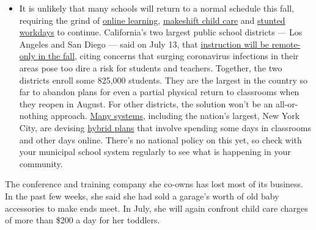 \begin{itemize}
  \begin{itemize}
  \tightlist
  \item
    It is unlikely that many schools will return to a normal schedule
    this fall, requiring the grind of
    \href{https://www.nytimes.com/2020/06/05/us/coronavirus-education-lost-learning.html?action=click\&pgtype=Article\&state=default\&region=MAIN_CONTENT_3\&context=storylines_faq}{online
    learning},
    \href{https://www.nytimes.com/2020/05/29/us/coronavirus-child-care-centers.html?action=click\&pgtype=Article\&state=default\&region=MAIN_CONTENT_3\&context=storylines_faq}{makeshift
    child care} and
    \href{https://www.nytimes.com/2020/06/03/business/economy/coronavirus-working-women.html?action=click\&pgtype=Article\&state=default\&region=MAIN_CONTENT_3\&context=storylines_faq}{stunted
    workdays} to continue. California's two largest public school
    districts --- Los Angeles and San Diego --- said on July 13, that
    \href{https://www.nytimes.com/2020/07/13/us/lausd-san-diego-school-reopening.html?action=click\&pgtype=Article\&state=default\&region=MAIN_CONTENT_3\&context=storylines_faq}{instruction
    will be remote-only in the fall}, citing concerns that surging
    coronavirus infections in their areas pose too dire a risk for
    students and teachers. Together, the two districts enroll some
    825,000 students. They are the largest in the country so far to
    abandon plans for even a partial physical return to classrooms when
    they reopen in August. For other districts, the solution won't be an
    all-or-nothing approach.
    \href{https://bioethics.jhu.edu/research-and-outreach/projects/eschool-initiative/school-policy-tracker/}{Many
    systems}, including the nation's largest, New York City, are
    devising
    \href{https://www.nytimes.com/2020/06/26/us/coronavirus-schools-reopen-fall.html?action=click\&pgtype=Article\&state=default\&region=MAIN_CONTENT_3\&context=storylines_faq}{hybrid
    plans} that involve spending some days in classrooms and other days
    online. There's no national policy on this yet, so check with your
    municipal school system regularly to see what is happening in your
    community.
  \end{itemize}
\end{itemize}

The conference and training company she co-owns has lost most of its
business. In the past few weeks, she said she had sold a garage's worth
of old baby accessories to make ends meet. In July, she will again
confront child care charges of more than \$200 a day for her toddlers.

